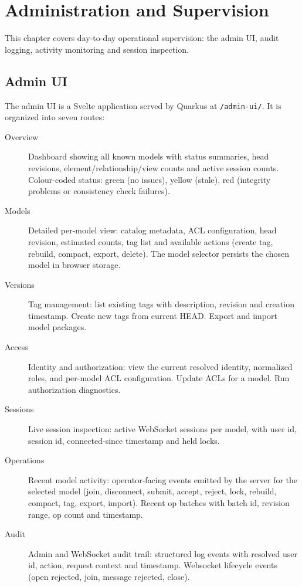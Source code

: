 \section{Administration and Supervision}
\label{sec:AdminOperations}

This chapter covers day-to-day operational supervision: the admin UI, audit
logging, activity monitoring and session inspection.

\subsection{Admin UI}

The admin UI is a Svelte application served by Quarkus at
\texttt{/admin-ui/}. It is organized into seven routes:

\begin{description}
\item[Overview] Dashboard showing all known models with status summaries,
  head revisions, element/relationship/view counts and active session counts.
  Colour-coded status: green (no issues), yellow (stale), red (integrity
  problems or consistency check failures).

\item[Models] Detailed per-model view: catalog metadata, ACL configuration,
  head revision, estimated counts, tag list and available actions (create
  tag, rebuild, compact, export, delete). The model selector persists the
  chosen model in browser storage.

\item[Versions] Tag management: list existing tags with description,
  revision and creation timestamp. Create new tags from current HEAD. Export
  and import model packages.

\item[Access] Identity and authorization: view the current resolved identity,
  normalized roles, and per-model ACL configuration. Update ACLs for a
  model. Run authorization diagnostics.

\item[Sessions] Live session inspection: active WebSocket sessions per
  model, with user id, session id, connected-since timestamp and held locks.

\item[Operations] Recent model activity: operator-facing events emitted by
  the server for the selected model (join, disconnect, submit, accept,
  reject, lock, rebuild, compact, tag, export, import). Recent op batches
  with batch id, revision range, op count and timestamp.

\item[Audit] Admin and WebSocket audit trail: structured log events with
  resolved user id, action, request context and timestamp. Websocket
  lifecycle events (open rejected, join, message rejected, close).
\end{description}

